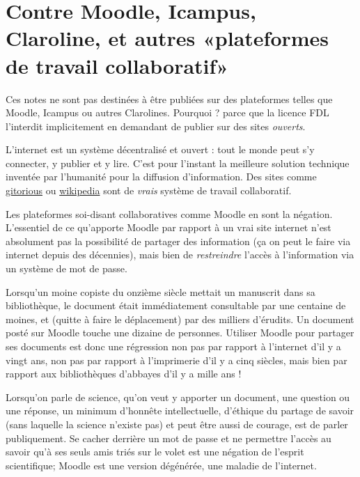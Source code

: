 \section{Contre Moodle, Icampus, Claroline, et autres «plateformes de travail collaboratif»}

Ces notes ne sont pas destinées à être publiées sur des plateformes telles que Moodle, Icampus ou autres Clarolines. Pourquoi ? parce que la licence FDL l'interdit implicitement en demandant de publier sur des sites \emph{ouverts}.

L'internet est un système décentralisé et ouvert : tout le monde peut s'y connecter, y publier et y lire. C'est pour l'instant la meilleure solution technique inventée par l'humanité pour la diffusion d'information. Des sites comme \href{http://gitorious.org}{gitorious} ou \href{http://wikipedia.org}{wikipedia} sont de \emph{vrais} système de travail collaboratif.

Les plateformes soi-disant collaboratives comme Moodle en sont la négation. L'essentiel de ce qu'apporte Moodle par rapport à un vrai site internet n'est absolument pas la possibilité de partager des information (ça on peut le faire via internet depuis des décennies), mais bien de \emph{restreindre} l'accès à l'information via un système de mot de passe.

Lorsqu'un moine copiste du onzième siècle mettait un manuscrit dans sa bibliothèque, le document était immédiatement consultable par une centaine de moines, et (quitte à faire le déplacement) par des milliers d'érudits. Un document posté sur Moodle touche une dizaine de personnes. Utiliser Moodle pour partager ses documents est donc une régression non pas par rapport à l'internet d'il y a vingt ans, non pas par rapport à l'imprimerie d'il y a cinq siècles, mais bien par rapport aux bibliothèques d'abbayes d'il y a mille ans !

Lorsqu'on parle de science, qu'on veut y apporter un document, une question ou une réponse, un minimum d'honnête intellectuelle, d'éthique du partage de savoir (sans laquelle la science n'existe pas) et peut être aussi de courage, est de parler publiquement. Se cacher derrière un mot de passe et ne permettre l'accès au savoir qu'à ses seuls amis triés sur le volet est une négation de l'esprit scientifique; Moodle est une version dégénérée, une maladie de l'internet.


